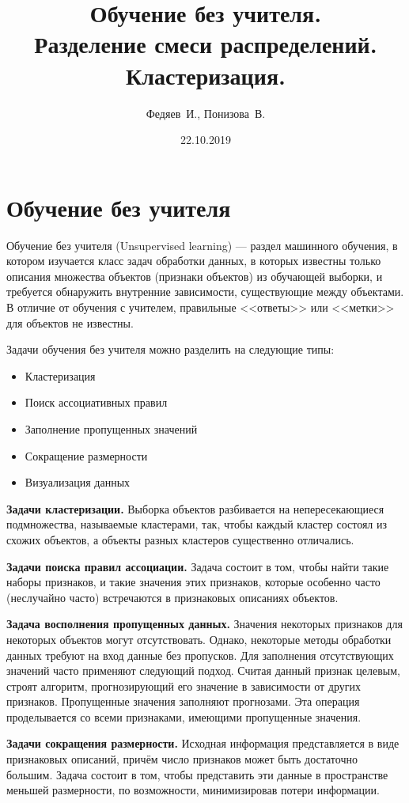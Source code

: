 \documentclass[10pt]{article}
\title{Обучение без учителя. \\Разделение смеси распределений. \\Кластеризация.}
\author{Федяев~И., Понизова~В.}
\date{22.10.2019} %
\begin{document}
\maketitle

\section{Обучение без учителя}

Обучение без учителя (Unsupervised learning) --- раздел машинного обучения, в котором изучается класс задач обработки данных, в которых известны
только описания множества объектов (признаки объектов) из обучающей выборки, и требуется обнаружить внутренние зависимости, существующие
между объектами. В отличие от обучения с учителем, правильные <<ответы>> или <<метки>> для объектов не известны.


Задачи обучения без учителя можно разделить на следующие типы:
\begin{itemize}
\item Кластеризация
\item Поиск ассоциативных правил
\item Заполнение пропущенных значений
\item Сокращение размерности
\item Визуализация данных
\end{itemize}

\textbf{Задачи кластеризации.}
Выборка объектов разбивается на непересекающиеся подмножества, называемые кластерами, так, чтобы каждый кластер состоял из схожих объектов, 
а объекты разных кластеров существенно отличались.

\textbf{Задачи поиска правил ассоциации.}
Задача состоит в том, чтобы найти такие наборы признаков, и такие значения этих признаков, 
которые особенно часто (неслучайно часто) встречаются в признаковых описаниях объектов.

\textbf{Задача восполнения пропущенных данных.}
Значения некоторых признаков для некоторых объектов могут отсутствовать. Однако, некоторые методы обработки данных требуют на вход данные без пропусков.
Для заполнения отсутствующих значений часто применяют следующий подход. 
Считая данный признак целевым, строят алгоритм, прогнозирующий его значение в зависимости от других признаков. Пропущенные значения заполняют прогнозами. 
Эта операция проделывается со всеми признаками, имеющими пропущенные значения. 

\textbf{Задачи сокращения размерности.}
Исходная информация представляется в виде признаковых описаний, причём число признаков может быть достаточно большим. 
Задача состоит в том, чтобы представить эти данные в пространстве меньшей размерности, по возможности, минимизировав потери информации.
\end{document}
